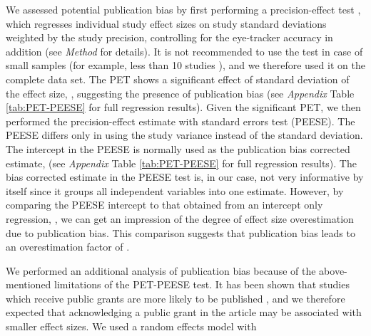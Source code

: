 We assessed potential publication bias by first performing a precision-effect test \citep[PET][]{stanley2014}, which regresses individual study effect sizes on study standard deviations weighted by the study precision, controlling for the eye-tracker accuracy in addition (see \textit{Method} for details). It is not recommended to use the test in case of small samples (for example, less than 10 studies \citep{vanaert2019}), and we therefore used it on the complete data set.  The PET shows a significant effect of standard deviation of the effect size, \unskip, suggesting the presence of publication bias (see \textit{Appendix} Table \ref{tab:PET-PEESE} for full regression results). Given the significant PET, we then performed the precision-effect estimate with standard errors test (PEESE). The PEESE differs only in using the study variance instead of the standard deviation. The intercept in the PEESE is normally used as the publication bias corrected estimate, \unskip (see \textit{Appendix} Table \ref{tab:PET-PEESE} for full regression results). The bias corrected estimate in the PEESE test is, in our case, not very informative by itself since it groups all independent variables into one estimate. However, by comparing the PEESE intercept to that obtained from an intercept only regression, \unskip, we can get an impression of the degree of effect size overestimation due to publication bias. This comparison suggests that publication bias leads to an overestimation factor of \unskip.

We performed an additional analysis of publication bias because of the above-mentioned limitations of the PET-PEESE test. It has been shown that studies which receive public grants are more likely to be published \citep{canestaro2017}, and we therefore expected that acknowledging a public grant in the article may be associated with smaller effect sizes. We used a random effects model with 


